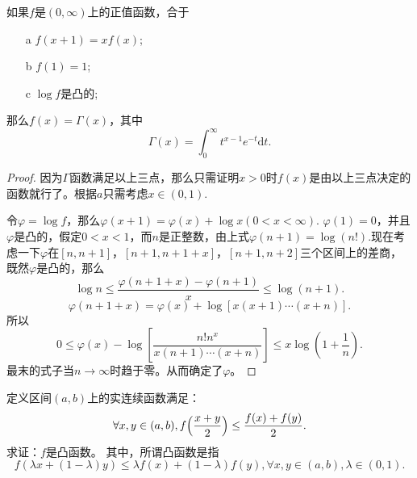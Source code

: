 \begin{example}
  如果$f$是$(0,\infty)$上的正值函数，合于
  \begin{enumerate}
  \item[a] $f(x+1)=xf(x)$;
  \item[b] $f(1)=1$;
  \item[c] $\log f$是凸的;
  \end{enumerate}
  那么$f(x)=\Gamma(x)$，其中
  \begin{equation*}
    \Gamma(x)=\int_0^{\infty}t^{x-1}e^{-t}\mathrm{d}t.
  \end{equation*}
\end{example} 

\begin{proof}
  因为$\Gamma$函数满足以上三点，那么只需证明$x>0$时$f(x)$是由以上三点决定的函数就行了。根据$a$只需考虑$x\in(0,1).$
  
  令$\varphi =\log f$，那么$\varphi(x+1)=\varphi(x)+\log x(0<x<\infty).$ $\varphi(1)=0$，并且$\varphi$是凸的，假定$0<x<1$，而$n$是正整数，由上式$\varphi(n+1)=\log (n!).$现在考虑一下$\varphi$在$[n,n+1]$，$[n+1,n+1+x]$，$[n+1,n+2]$三个区间上的差商，既然$\varphi$是凸的，那么$$\log n\leq\frac{\varphi(n+1+x)-\varphi(n+1)}{x}\leq\log(n+1).$$
  $$\varphi(n+1+x)=\varphi(x)+\log[x(x+1)\cdots(x+n)].$$
  所以$$0\leq\varphi(x)-\log[\frac{n!n^x}{x(n+1)\cdots(x+n)}]\leq x\log(1+\frac{1}{n}).$$
  最末的式子当$n\to\infty$时趋于零。从而确定了$\varphi$。
  \end{proof}
 
\begin{example}
定义区间$(a,b)$上的实连续函数满足：
\begin{equation*}
\forall x,y \in(a,b),f\Bigl(\frac{x+y}{2}\Bigr)\leq\frac{f(x)+f(y)}{2}.
\end{equation*}
求证：$f$是凸函数。
其中，所谓凸函数是指
\begin{equation*}
f(\lambda x+(1-\lambda)y)\leq\lambda f(x)+(1-\lambda)f(y),
\forall x,y\in(a,b),\lambda\in(0,1).
\end{equation*}
\end{example}

